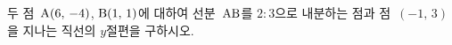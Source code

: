 두 점~$\mathrm{A}(6,\,-4)$, $\mathrm{B}(1,\,1)$에 대하여 선분~$\mathrm{AB}$를 $2:3$으로 내분하는 점과 점~$(-1,\,3)$을 지나는 직선의 $y$절편을 구하시오.
